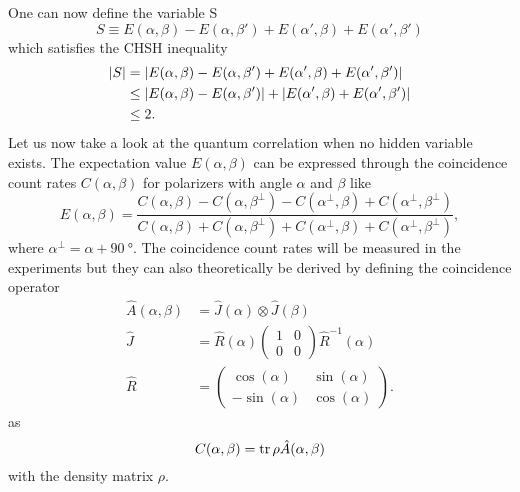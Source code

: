 One can now define the variable S
\begin{equation}
S\equiv E(\alpha,\beta)-E(\alpha,\beta')+E(\alpha',\beta)+E(\alpha',\beta')
\label{eq:a:S}
\end{equation}
which satisfies the CHSH inequality
\begin{subequations}
\label{eq:a:CHSH}
\begin{align}
\abs{S}
    &=\abs{E(\alpha,\beta)-E(\alpha,\beta')+E(\alpha',\beta)+E(\alpha',\beta')}
    \label{eq:a:CHSH:1}\\
    &\leq \abs{E(\alpha,\beta)-E(\alpha,\beta')}+\abs{E(\alpha',\beta)+E(\alpha',\beta')}
    \label{eq:a:CHSH:2}\\
    &\leq 2
    \label{eq:a:CHSH:3}.
\end{align}
\end{subequations}
Let us now take a look at the quantum correlation when no hidden variable exists.
The expectation value $E(\alpha,\beta)$ can be expressed through the coincidence count rates $C(\alpha,\beta)$ for polarizers with angle $\alpha$ and $\beta$ like
\begin{equation}
E(\alpha,\beta)=\frac{C(\alpha,\beta)-C(\alpha,\beta^\perp)-C(\alpha^\perp,\beta)+C(\alpha^\perp,\beta^\perp)}{C(\alpha,\beta)+C(\alpha,\beta^\perp)+C(\alpha^\perp,\beta)+C(\alpha^\perp,\beta^\perp)},
\label{eq:a:EC}
\end{equation}
where $\alpha^\perp=\alpha+\SI{90}{\degree}$.
The coincidence count rates will be measured in the experiments but they can also theoretically be derived by defining the coincidence operator
\begin{align}
\hat A(\alpha,\beta)
    &=\hat J(\alpha)\otimes \hat J(\beta)
    \label{eq:a:A}\\
\hat J
    &=\hat R(\alpha) \begin{pmatrix}
    1&0\\0&0
    \end{pmatrix}\hat R^{-1}(\alpha)
    \label{eq:a:J}\\
\hat R
    &=\begin{pmatrix}
    \cos(\alpha)&\sin(\alpha)\\
    -\sin(\alpha)&\cos(\alpha)
    \end{pmatrix}.
    \label{eq:a:R}
\end{align}
as
\begin{equation}
C(\alpha,\beta)   = \trace{\rho \hat A(\alpha,\beta)}
\label{eq:a:CA}
\end{equation}
with the density matrix $\rho$.

